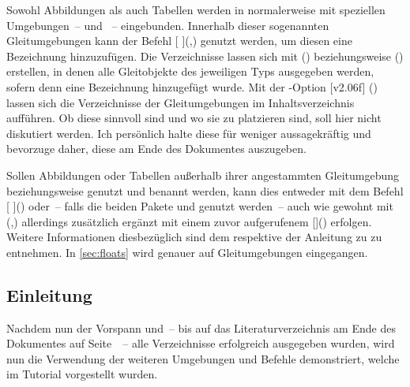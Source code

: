 \documentclass[%
  english,ngerman,%
  cdgeometry=no,DIV=12,%
  automark,%
  listof=toc,%
]{tudscrartcl}
\begin{document}
Sowohl Abbildungen als auch Tabellen werden in  normalerweise 
mit speziellen Umgebungen~--  und ~-- 
eingebunden. Innerhalb dieser sogenannten Gleitumgebungen kann der Befehl 
[%
](,)
genutzt werden, um diesen eine Bezeichnung hinzuzufügen. Die Verzeichnisse 
lassen sich mit () beziehungsweise 
() erstellen, in denen alle 
Gleitobjekte des jeweiligen Typs ausgegeben werden, sofern denn eine 
Bezeichnung hinzugefügt wurde. Mit der \KOMAScript-Option 
[v2.06f]
%
() lassen sich die Verzeichnisse der 
Gleitumgebungen im Inhaltsverzeichnis aufführen. Ob diese sinnvoll sind und wo 
sie zu platzieren sind, soll hier nicht diskutiert werden. Ich persönlich halte 
diese für weniger aussagekräftig und bevorzuge daher, diese am Ende des 
Dokumentes auszugeben. 

Sollen Abbildungen oder Tabellen außerhalb ihrer angestammten Gleitumgebung 
 beziehungsweise  genutzt und benannt 
werden, kann dies entweder mit dem Befehl 
[%
]() oder~-- falls die beiden Pakete  und 
 genutzt werden~-- auch wie gewohnt mit 
(,) allerdings zusätzlich 
ergänzt mit einem zuvor aufgerufenem
[]()  
erfolgen. Weitere Informationen diesbezüglich sind dem \scrguide respektive der 
Anleitung zu  zu entnehmen. In \autoref{sec:floats} wird 
genauer auf Gleitumgebungen eingegangen.
%
\begin{Trunk}
\tableofcontents
\listoffigures
\listoftables

\end{Trunk}
\begin{Trunk+}
\printacronyms[style=acrotabu]
\printsymbols[style=symblongtabu]

\chapter{Einleitung}
Nachdem nun der Vorspann und~-- bis auf das Literaturverzeichnis am 
Ende des Dokumentes auf Seite~\pageref{sec:bibliography}~-- alle 
Verzeichnisse erfolgreich ausgegeben wurden, wird nun die Verwendung 
der weiteren Umgebungen und Befehle demonstriert, welche im Tutorial 
 vorgestellt wurden.

\end{Trunk+}
\end{document}
